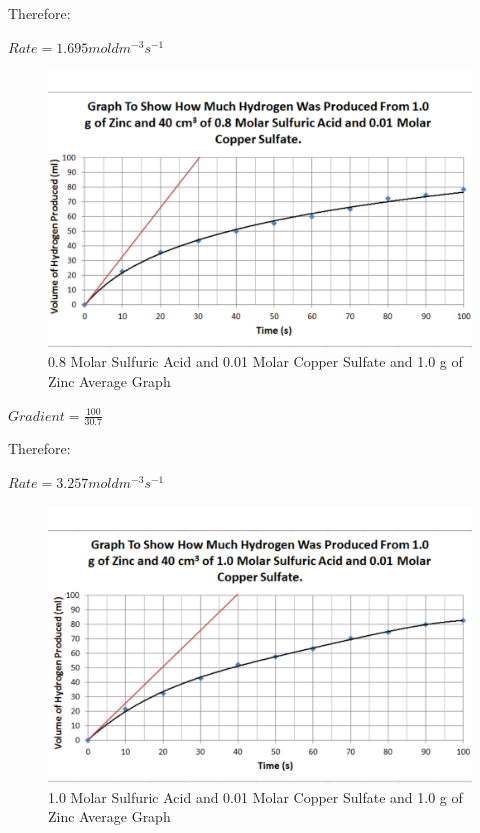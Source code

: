Therefore:

$Rate = 1.695 mol dm^{-3} s^{-1}$

\begin{figure}[H]
    \includegraphics[width=\textwidth]{./Analysis/Images/2Catalysed/08Molar.pdf}
    \caption{0.8 Molar Sulfuric Acid and 0.01 Molar Copper Sulfate and 1.0 g of Zinc Average Graph} \label{fig:08MolarSACSGradient}
\end{figure}

$Gradient = \frac{100}{30.7}$

Therefore:

$Rate = 3.257 mol dm^{-3} s^{-1}$

\begin{figure}[H]
    \includegraphics[width=\textwidth]{./Analysis/Images/2Catalysed/10Molar.pdf}
    \caption{1.0 Molar Sulfuric Acid and 0.01 Molar Copper Sulfate and 1.0 g of Zinc Average Graph} \label{fig:10MolarSACSGradient}
\end{figure}

